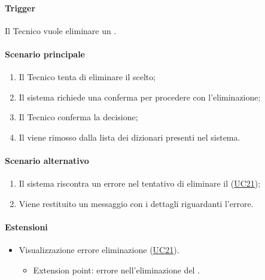 \paragraph*{Trigger}
Il Tecnico vuole eliminare un .

\paragraph*{Scenario principale}
\begin{enumerate}
  \item Il Tecnico tenta di eliminare il  scelto;
  \item Il sistema richiede una conferma per procedere con l'eliminazione;
  \item Il Tecnico conferma la decisione;
  \item Il  viene rimosso dalla lista dei dizionari presenti nel sistema.  
\end{enumerate}

\paragraph*{Scenario alternativo}
\begin{enumerate}
  \item Il sistema riscontra un errore nel tentativo di eliminare il  (\hyperref[UC21]{UC21});
  \item Viene restituito un messaggio con i dettagli riguardanti l'errore.
\end{enumerate}


\paragraph*{Estensioni}
\begin{itemize}
  \item Visualizzazione errore eliminazione  (\hyperref[UC21]{UC21}).
  \begin{itemize}
    \item Extension point: errore nell'eliminazione del .
  \end{itemize}
\end{itemize}
